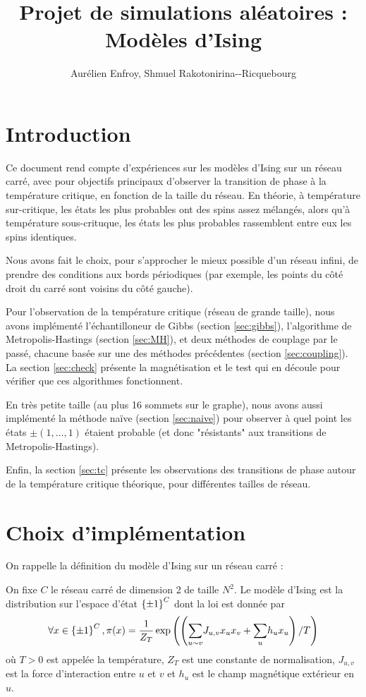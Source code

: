 \documentclass[a4paper,11pt]{article}
\title{Projet de simulations aléatoires : Modèles d'Ising}
\author{Aurélien Enfroy, Shmuel Rakotonirina{-}-Ricquebourg}
\begin{document}
\maketitle
\tableofcontents

\section{Introduction}

Ce document rend compte d'expériences sur les modèles d'Ising sur un réseau carré, avec pour objectifs principaux d'observer la transition de phase à la température critique, en fonction de la taille du réseau. En théorie, à température sur-critique, les états les plus probables ont des spins assez mélangés, alors qu'à température sous-crituque, les états les plus probables rassemblent entre eux les spins identiques.

Nous avons fait le choix, pour s'approcher le mieux possible d'un réseau infini, de prendre des conditions aux bords périodiques (par exemple, les points du côté droit du carré sont voisins du côté gauche).

Pour l'observation de la température critique (réseau de grande taille), nous avons implémenté l'échantilloneur de Gibbs (section \ref{sec:gibbs}), l'algorithme de Metropolis-Hastings (section \ref{sec:MH}), et deux méthodes de couplage par le passé, chacune basée sur une des méthodes précédentes (section \ref{sec:coupling}). La section \ref{sec:check} présente la magnétisation et le test qui en découle pour vérifier que ces algorithmes fonctionnent.

En très petite taille (au plus 16 sommets sur le graphe), nous avons aussi implémenté la méthode naïve (section \ref{sec:naive}) pour observer à quel point les états $\pm(1,\hdots,1)$ étaient probable (et donc "résistants" aux transitions de Metropolis-Hastings).

Enfin, la section \ref{sec:tc} présente les observations des transitions de phase autour de la température critique théorique, pour différentes tailles de réseau.

\section{Choix d'implémentation}\label{sec:implementation}

On rappelle la définition du modèle d'Ising sur un réseau carré :
\begin{definition}
On fixe $C$ le réseau carré de dimension 2 de taille $N^2$. Le modèle d'Ising est la distribution sur l'espace d'état $\left\lbrace \pm 1 \right\rbrace^C$ dont la loi est donnée par
$$\forall x \in \left\lbrace \pm 1 \right\rbrace^C, \pi(x) = \frac{1}{Z_T} \exp \left(\left( \displaystyle{\sum_{u\sim v}^{}} J_{u,v} x_{u} x_{v} + \displaystyle{\sum_{u}^{}} h_{u} x_{u} \right)/T\right)$$
où $T>0$ est appelée la température, $Z_T$ est une constante de normalisation, $J_{u,v}$ est la force d'interaction entre $u$ et $v$ et $h_{u}$ est le champ magnétique extérieur en $u$.
\end{definition}
\end{document}
